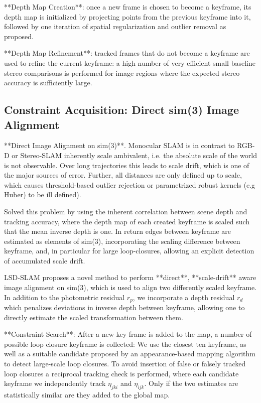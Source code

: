 **Depth Map Creation**: once a new frame is chosen to become a keyframe, its
depth map is initialized by projecting points from the previous keyframe into
it, followed by one iteration of spatial regularization and outlier removal as
proposed.

**Depth Map Refinement**: tracked frames that do not become a keyframe are used
to refine the current keyframe: a high number of very efficient small baseline
stereo comparisons is performed for image regions where the expected stereo
accuracy is sufficiently large.


\subsection{Constraint Acquisition: Direct sim(3) Image Alignment}

**Direct Image Alignment on sim(3)**. Monocular SLAM is in contrast to RGB-D or
Stereo-SLAM inherently scale ambivalent, i.e. the absolute scale of the world
is not observable. Over long trajectories this leads to scale drift, which is
one of the major sources of error. Further, all distances are only defined up
to scale, which causes threshold-based outlier rejection or parametrized robust
kernels (e.g Huber) to be ill defined).

Solved this problem by using the inherent correlation between scene depth and
tracking accuracy, where the depth map of each created keyframe is scaled such
that the mean inverse depth is one. In return edges between keyframe are
estimated as elements of sim(3), incorporating the scaling difference between
keyframe, and, in particular for large loop-closures, allowing an explicit
detection of accumulated scale drift.

LSD-SLAM proposes a novel method to perform **direct**, **scale-drift** aware
image alignment on sim(3), which is used to align two differently scaled
keyframe. In addition to the photometric residual $r_p$, we incorporate a depth
residual $r_d$ which penalizes deviations in inverse depth between keyframe,
allowing one to directly estimate the scaled transformation between them.


**Constraint Search**: After a new key frame is added to the map, a number of
possible loop closure keyframe is collected: We use the closest ten keyframe,
as well as a suitable candidate proposed by an appearance-based mapping
algorithm to detect large-scale loop closures. To avoid insertion of false or
falsely tracked loop closures a reciprocal tracking check is performed, where
each candidate keyframe we independently track $\eta_{jki}$ and $\eta_{ijk}$.
Only if the two estimates are statistically similar are they added to the
global map.

